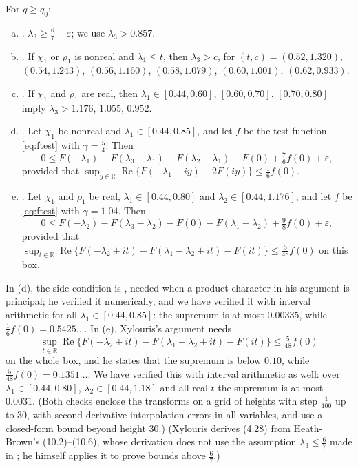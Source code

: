 \documentclass[11pt]{amsart}
\numberwithin{equation}{section}
\theoremstyle{plain}
\theoremstyle{definition}
\theoremstyle{remark}
\newcommand{\RR}{\mathbb{R}}
\renewcommand{\Re}{\operatorname{Re}}
\newcommand{\eps}{\varepsilon}
\newcommand{\1}{\mathbf{1}}
\begin{document}
\begin{inp}\label{inp:lambda3}
For $q\ge q_0$:
\begin{enumerate}[(a)]
  \item \cite[Lemma~10.3]{HeathBrown1992zero}. $\lambda_3\ge\frac67-\eps$; we use $\lambda_3>0.857$.
  \item \cite[Table~8, column ``alle F\"alle'', p.~55]{Xylouris2011nullstellen}. If $\chi_1$ or $\rho_1$ is
    nonreal and $\lambda_1\le t$, then $\lambda_3>c$, for $(t,c)=(0.52,1.320)$, $(0.54,1.243)$,
    $(0.56,1.160)$, $(0.58,1.079)$, $(0.60,1.001)$, $(0.62,0.933)$.
  \item \cite[Lemma~4.4 and Table~10, p.~55]{Xylouris2011nullstellen}. If $\chi_1$ and $\rho_1$ are real, then
    $\lambda_1\in[0.44,0.60]$, $[0.60,0.70]$, $[0.70,0.80]$ imply $\lambda_3>1.176$, $1.055$, $0.952$.
  \item \cite[(4.28)--(4.29), pp.~56--57]{Xylouris2011nullstellen}. Let $\chi_1$ be nonreal and
    $\lambda_1\in[0.44,0.85]$, and let $f$ be the test function \eqref{eq:ftest} with $\gamma=\frac54$. Then
    \[
      0\le F(-\lambda_1)-F(\lambda_3-\lambda_1)-F(\lambda_2-\lambda_1)-F(0)+\tfrac76f(0)+\eps,
    \]
    provided that $\sup_{y\in\RR}\Re\{F(-\lambda_1+iy)-2F(iy)\}\le\frac16f(0)$.
  \item \cite[(4.31) and (4.34), pp.~58--59]{Xylouris2011nullstellen}. Let $\chi_1$ and $\rho_1$ be real,
    $\lambda_1\in[0.44,0.80]$ and $\lambda_2\in[0.44,1.176]$, and let $f$ be \eqref{eq:ftest} with
    $\gamma=1.04$. Then
    \[
      0\le F(-\lambda_2)-F(\lambda_3-\lambda_2)-F(0)-F(\lambda_1-\lambda_2)+\tfrac98f(0)+\eps,
    \]
    provided that $\sup_{t\in\RR}\Re\{F(-\lambda_2+it)-F(\lambda_1-\lambda_2+it)-F(it)\}\le\frac5{48}f(0)$ on this box.
\end{enumerate}
\end{inp}

In (d), the side condition is \cite[(4.29)]{Xylouris2011nullstellen}, needed when a product character in his argument
is principal; he verified it numerically, and we have verified it with interval arithmetic for
all $\lambda_1\in[0.44,0.85]$: the supremum is at most $0.00335$, while $\frac16f(0)=0.5425\ldots$. In (e),
Xylouris's argument \cite[(4.32)--(4.34), p.~59]{Xylouris2011nullstellen} needs
\[
  \sup_{t\in\RR}\Re\bigl\{F(-\lambda_2+it)-F(\lambda_1-\lambda_2+it)-F(it)\bigr\}\le\tfrac5{48}f(0)
\]
on the whole box, and he states that the supremum is below $0.10$, while $\frac5{48}f(0)=0.1351\ldots$. We have
verified this with interval arithmetic as well: over $\lambda_1\in[0.44,0.80]$, $\lambda_2\in[0.44,1.18]$ and all real
$t$ the supremum is at most $0.0031$. (Both checks enclose the transforms on a grid of heights with
step $\frac1{100}$ up to $30$, with second-derivative interpolation errors in all variables, and use a
closed-form bound beyond height $30$.) (Xylouris derives (4.28) from Heath-Brown's (10.2)--(10.6), whose derivation does not use
the assumption $\lambda_3\le\frac67$ made in \cite[\S10]{HeathBrown1992zero}; he himself applies it to
prove bounds above $\frac67$.)
\end{document}
